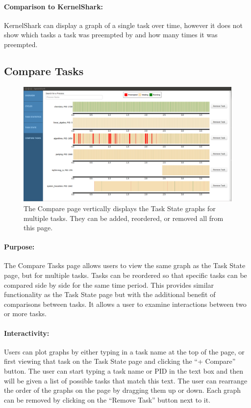 \documentclass{hmcclinic}
\begin{document}
\paragraph{Comparison to KernelShark:}
     KernelShark can display a graph of a single task over time, however it does not show which tasks a task was preempted by and how many times it was preempted.
  
  \subsection{Compare Tasks} %
  
  \begin{figure}[H]
  \includegraphics[scale=0.25]{compare-page.png}
  \caption{The Compare page vertically displays the Task State graphs for
  multiple tasks. They can be added, reordered, or removed all from this page.}
  \end{figure}

\paragraph{Purpose:}
The Compare Tasks page allows users to view the same graph as the Task State
page, but for multiple tasks. Tasks can be reordered so that specific tasks can
be compared side by side for the same time period. This provides similar
functionality as the Task State page but with the additional benefit of
comparisons between tasks. It allows a user to examine interactions between
two or more tasks. 

\paragraph{Interactivity:}
Users can plot graphs by either typing in a task name at the top of the page, or
first viewing that task on the Task State page and clicking the ``+ Compare''
button. The user can start typing a task name or PID in the text box and then
will be given a list of possible tasks that match this text. The user can
rearrange the order of the graphs on the page by dragging them up or down. Each
graph can be removed by clicking on the ``Remove Task'' button next to it.
    
\end{document}
